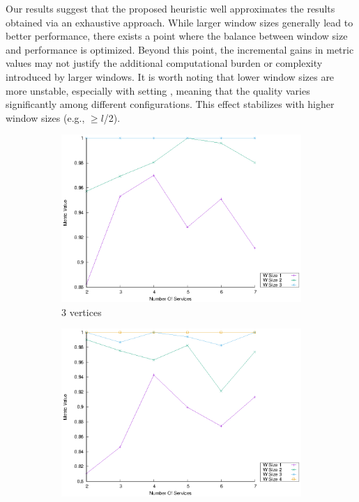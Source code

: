 Our results suggest that the proposed heuristic well approximates the results obtained via an exhaustive approach. While larger window sizes generally lead to better performance, there exists a point where the balance between window size and performance is optimized. Beyond this point, the incremental gains in metric values may not justify the additional computational burden or complexity introduced by larger windows. It is worth noting that lower window sizes are more unstable, especially with setting \wide, meaning that the quality varies significantly among different configurations. This effect stabilizes with higher window sizes (e.g., \windowsize$\geq$$l$/2).






\begin{figure}[!htb]
  \centering
  \begin{subfigure}{0.33\textwidth}
    \includegraphics[width=\textwidth]{Images/graphs/window_quality_performance_diff_perce_n7_s7_20_100_n3}
    \caption{3 vertices}
    \label{fig:quality_window_perce_wide_3n}
  \end{subfigure}
  \hfill
  \begin{subfigure}{0.33\textwidth}
    \includegraphics[width=\textwidth]{Images/graphs/window_quality_performance_diff_perce_n7_s7_20_100_n4}

\end{subfigure}
\end{figure}

